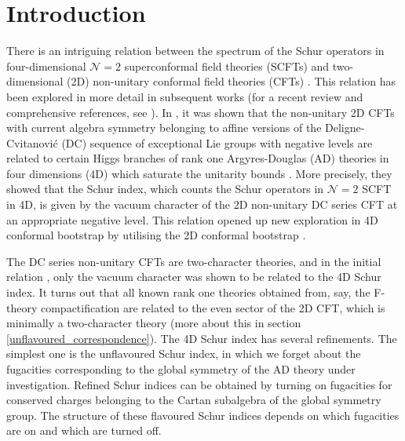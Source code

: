 \documentclass[a4paper,12pt]{article}
\begin{document}
\section{Introduction}
There is an intriguing relation between the spectrum of the Schur operators in four-dimensional $\mathcal{N}=2$ superconformal field
theories (SCFTs) and two-dimensional (2D) non-unitary conformal field theories (CFTs) \cite{Beem:2013sza}. This relation has been explored in
more detail in subsequent works \cite{Beem:2013sza,Beem:2014rza,Beem:2017ooy,Beem:2019tfp,Buican:2014qla,Buican:2015ina,Buican:2017rya,Buican:2019evc,Buican:2019huq,Buican:2021axn} (for a recent
review and comprehensive references, see \cite{Lemos:2020pqv}). In \cite{Beem:2013sza}, it was shown that the non-unitary 2D CFTs with current algebra
symmetry belonging to affine versions of the Deligne-Cvitanovi\'c (DC) \cite{deligne1996serie,deligne1996serie2,Cvitanovic:2008zz} sequence of exceptional Lie groups with negative levels are related to certain Higgs branches of rank one Argyres-Douglas (AD) theories in four dimensions (4D) which saturate the unitarity bounds \cite{Lemos:2015orc, Beem:2017ooy}.  More precisely, they showed that the Schur index, which counts the Schur operators in $\mathcal{N}=2$ SCFT in 4D, is given by the vacuum character of the 2D non-unitary DC series CFT at an appropriate negative level.  This relation opened up new exploration in 4D conformal bootstrap by utilising the 2D conformal bootstrap \cite{Kaidi:2022sng}.

The DC series non-unitary CFTs are two-character theories, and in the initial relation \cite{Beem:2013sza}, only the vacuum character was shown to be related to the 4D Schur index.  It turns out that all known rank one theories obtained from, say, the F-theory compactification are related to the even sector of the  2D CFT, which is minimally a two-character theory (more about this in section \ref{unflavoured_correspondence}).  The 4D Schur index has several refinements. The simplest one is the unflavoured Schur index, in which we forget about the fugacities corresponding to the global symmetry of the AD theory under investigation. Refined Schur indices can be obtained by turning on fugacities for conserved charges belonging to the Cartan subalgebra of the global symmetry group.  The structure of these flavoured Schur indices depends on which fugacities are on and which are turned off.  
\end{document}

